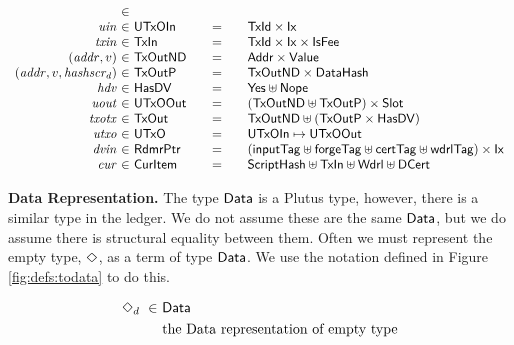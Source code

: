 \begin{figure*}[htb]
\begin{equation*}
\begin{array}{r@{~\in~}l@{\qquad=\qquad}lr}
      \\
      \var{uin}
      & \UTxOIn
      & \TxId \times \Ix
      \\
      \var{txin}
      & \TxIn
      & \TxId \times \Ix \times \IsFee
      \\
      (\var{addr}, v)
      & \type{TxOutND}
      & \Addr \times \Value
      \\
      (\var{addr}, v, \var{hashscr_d})
      & \type{TxOutP}
      & \type{TxOutND} \times \DataHash
      \\
      \var{hdv}
      & \HasDV
      & \Yes \uniondistinct \Nope
      \\
      \var{uout}
      & \UTxOOut
      & (\TxOutND \uniondistinct \TxOutP) \times \Slot
      \\
      \var{txotx}
      & \TxOut
      & \TxOutND \uniondistinct (\TxOutP \times \HasDV)
      \\
      \var{utxo}
      & \UTxO
      & \UTxOIn \mapsto \UTxOOut
      \\
      \var{dvin}
      & \RdmrPtr
      & (\mathsf{inputTag} \uniondistinct \mathsf{forgeTag} \uniondistinct
      \mathsf{certTag} \uniondistinct \mathsf{wdrlTag}) \times \Ix
      \\
      \var{cur}
      & \CurItem
      & \ScriptHash \uniondistinct \TxIn \uniondistinct \Wdrl \uniondistinct \DCert
    \end{array}
  \end{equation*}
  \caption{Definitions used in the UTxO transition system}
  \label{fig:defs:utxo-shelley-1}
\end{figure*}


\textbf{Data Representation.}
The type $\mathsf{Data}$ is a Plutus type, however, there is a similar type in the
ledger. We do not assume these are the same $\mathsf{Data}$, but we do assume there
is structural equality between them. Often we must represent the empty type,
$\Diamond$, as a term of type $\mathsf{Data}$. We use the notation defined in
Figure \ref{fig:defs:todata} to do this.

\begin{figure*}[htb]
  \begin{align*}
    \Diamond_d ~\in~& \mathsf{Data} \\
    & \text{the Data representation of empty type} \\
  \end{align*}
  \caption{Empty Data Representation}
  \label{fig:defs:todata}
\end{figure*}


